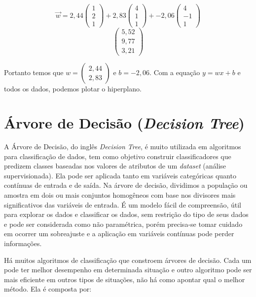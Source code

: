 \documentclass[
  openany]{book}
\begin{document}
\[\vec{w}=2,44\begin{pmatrix} 1\\2\\1\end{pmatrix}+
2,83\begin{pmatrix} 4\\1\\1\end{pmatrix}+
-2,06\begin{pmatrix} 4\\-1\\1\end{pmatrix}\]
\[\begin{pmatrix}5,52\\9,77\\3,21\end{pmatrix}\]

Portanto temos que \(w=\begin{pmatrix} 2,44\\2,83\end{pmatrix}\) e \(b=-2,06\). Com a equação \(y=wx+b\) e todos os dados, podemos plotar o hiperplano.

\hypertarget{decisiontree}{%
\section{\texorpdfstring{Árvore de Decisão (\emph{Decision Tree})}{Árvore de Decisão (Decision Tree)}}\label{decisiontree}}

A Árvore de Decisão, do inglês \emph{Decision Tree}, é muito utilizada em algoritmos para classificação de dados, tem como objetivo construir classificadores que predizem classes baseadas nos valores de atributos de um \emph{dataset} (análise supervisionada). Ela pode ser aplicada tanto em variáveis categóricas quanto contínuas de entrada e de saída. Na árvore de decisão, dividimos a população ou amostra em dois ou mais conjuntos homogêneos com base nos divisores mais significativos das variáveis de entrada. É um modelo fácil de compreensão, útil para explorar os dados e classificar os dados, sem restrição do tipo de seus dados e pode ser considerada como não paramétrica, porém precisa-se tomar cuidado em ocorrer um sobreajuste e a aplicação em variáveis contínuas pode perder informações.

Há muitos algoritmos de classificação que constroem árvores de decisão. Cada um pode ter melhor desempenho em determinada situação e outro algoritmo pode ser mais eficiente em outros tipos de situações, não há como apontar qual o melhor método. Ela é composta por:
\end{document}
